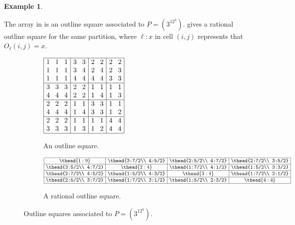 \documentclass[preprint,nonatbib]{elsarticle}
\theoremstyle{definition}
\newtheorem{example}[theorem]{Example}
\numberwithin{equation}{section}
\begin{document}
\begin{example}
\label{ex: outline squares}

The array in  is an outline square associated to $P = (3^12^3)$.  gives a rational outline square for the same partition, where $\ell:x$ in cell $(i,j)$ represents that $O_\ell(i,j)=x$.

    \begin{figure}[h]
    \centering
    \begin{subfigure}{0.38\textwidth}
        \centering
        $\arraycolsep=4pt\begin{array}{|ccc|cc|cc|cc|} \hline
        1 & 1 & 1 & 3 & 3 & 2 & 2 & 2 & 2 \\
        1 & 1 & 1 & 3 & 4 & 2 & 4 & 2 & 3 \\
        1 & 1 & 1 & 4 & 4 & 4 & 4 & 3 & 3 \\ \hline
        3 & 3 & 3 & 2 & 2 & 1 & 1 & 1 & 1 \\ 
        4 & 4 & 4 & 2 & 2 & 1 & 4 & 1 & 3 \\ \hline
        2 & 2 & 2 & 1 & 1 & 3 & 3 & 1 & 1 \\
        4 & 4 & 4 & 1 & 4 & 3 & 3 & 1 & 2 \\ \hline
        2 & 2 & 2 & 1 & 1 & 1 & 1 & 4 & 4 \\
        3 & 3 & 3 & 1 & 3 & 1 & 2 & 4 & 4 \\ \hline
        \end{array}$
        \caption{An outline square.}
        \label{outline square}
    \end{subfigure}
    \begin{subfigure}{0.38\textwidth}
        \centering
        $\arraycolsep=4pt\begin{array}{|c|c|c|c|} \hline
        \thead{1:9} & \thead{3:7/2\\ 4:5/2} & \thead{2:5/2\\ 4:7/2} & 
        \thead{2:7/2\\ 3:5/2} \\ \hline
        \thead{3:5/2\\ 4:7/2} & \thead{2:4} & \thead{1:7/2\\ 4:1/2} & 
        \thead{1:5/2\\ 3:3/2} \\ \hline
        \thead{2:7/2\\ 4:5/2} & \thead{1:5/2\\ 4:3/2} & \thead{3:4} & 
        \thead{1:7/2\\ 2:1/2} \\ \hline
        \thead{2:5/2\\ 3:7/2} & \thead{1:7/2\\ 3:1/2} & \thead{1:5/2\\ 2:3/2} & 
        \thead{4:4} \\ \hline
        \end{array}$
        \caption{A rational outline square.}
        \label{rational outline rectangle}
    \end{subfigure}
    \caption{Outline squares associated to $P = (3^12^3)$.}
    \end{figure}
\end{example}
\end{document}
